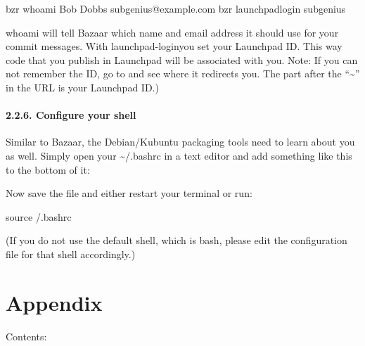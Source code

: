 \documentclass[letterpaper,10pt,english]{sphinxmanual}
\begin{document}
%
\begin{sphinxVerbatim}[commandchars=\\\{\}]
\PYGZdl{} bzr whoami \PYGZdq{}Bob Dobbs \PYGZlt{}subgenius@example.com\PYGZgt{}\PYGZdq{}
\PYGZdl{} bzr launchpad\PYGZhy{}login subgenius
\end{sphinxVerbatim}

whoami will tell Bazaar which name and email address it should use for your commit messages. With launchpad-loginyou set your Launchpad ID. This way code that you publish in Launchpad will be associated with you.
Note: If you can not remember the ID, go to  and see where it redirects you. The part after the “\textasciitilde{}” in the URL is your Launchpad ID.)


\subsubsection{2.2.6. Configure your shell}
\label{\detokenize{docs/packaging_guide/getting_started:configure-your-shell}}
Similar to Bazaar, the Debian/Kubuntu packaging tools need to learn about you as well. Simply open your \textasciitilde{}/.bashrc in a text editor and add something like this to the bottom of it:

%
\begin{sphinxVerbatim}[commandchars=\\\{\}]
 
 
\end{sphinxVerbatim}

Now save the file and either restart your terminal or run:

%
\begin{sphinxVerbatim}[commandchars=\\\{\}]
\PYGZdl{} source \PYGZti{}/.bashrc
\end{sphinxVerbatim}

(If you do not use the default shell, which is bash, please edit the configuration file for that shell accordingly.)


\chapter{Appendix}
\label{\detokenize{docs/appendix/appendix:appendix}}\label{\detokenize{docs/appendix/appendix::doc}}
Contents:
\end{document}
